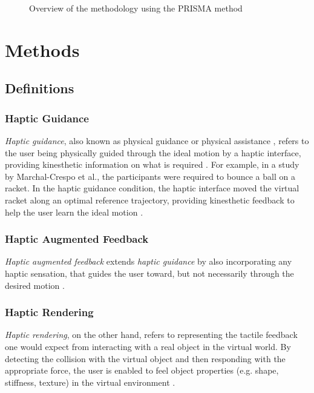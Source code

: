 
\begin{figure*}[htbp]
    \centering
     
    \caption{Overview of the methodology using the PRISMA method}
    \label{fig:prisma}
\end{figure*}

\section{Methods}
\label{sec:methods}

\subsection{Definitions}
\label{sec:definitions}

\subsubsection{Haptic Guidance}
\textit{Haptic guidance}, also known as physical guidance or physical assistance \cite{Sigrist2013AugmentedReview}, refers to the user being physically guided through the ideal motion by a haptic interface, providing kinesthetic information on what is required \cite{Feygin2002HapticSkill}. 
For example, in a study by Marchal-Crespo et al., the participants were required to bounce a ball on a racket. In the haptic guidance condition, the haptic interface moved the virtual racket along an optimal reference trajectory, providing kinesthetic feedback to help the user learn the ideal motion \cite{Crespo2015}.

\subsubsection{Haptic Augmented Feedback}
\textit{Haptic augmented feedback} extends \textit{haptic guidance} by also incorporating any haptic sensation, that guides the user toward, but not necessarily through the desired motion \cite{Sigrist2013AugmentedReview}.

\subsubsection{Haptic Rendering}
\textit{Haptic rendering}, on the other hand, refers to representing the tactile feedback one would expect from interacting with a real object in the virtual world. By detecting the collision with the virtual object and then responding with the appropriate force, the user is enabled to feel object properties (e.g. shape, stiffness, texture) in the virtual environment \cite{Basdogan2002HapticEnvironments, Salisbury1997Phantom-basedObjects}. 

